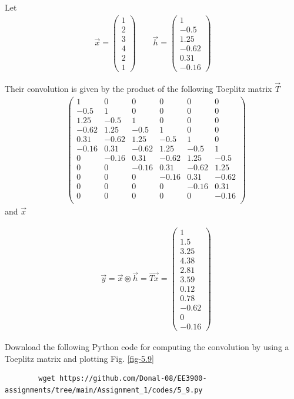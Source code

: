 \documentclass[journal,12pt,twocolumn]{IEEEtran}
\newcommand{\myvec}[1]{\ensuremath{\begin{pmatrix}#1\end{pmatrix}}}
\renewcommand\thesection{\arabic{section}}
\begin{document}
\begin{enumerate}[label=\thesection.\arabic*]
	\solution Let 
	\begin{align}
		\vec{x} = \myvec{1 \\ 2 \\ 3 \\ 4 \\ 2 \\ 1} \qquad
		\vec{h} = \myvec{1 \\ -0.5 \\ 1.25 \\ -0.62 \\ 0.31 \\ -0.16}
	\end{align}
	
	Their convolution is given by the product of the following Toeplitz matrix $\vec{T}$
	\begin{align}
		&\myvec{
			1 & 0 & 0 & 0 & 0 & 0 \\
			-0.5 & 1 & 0 & 0 & 0 & 0 \\
			1.25 & -0.5 & 1 & 0 & 0 & 0 \\
			-0.62 & 1.25 & -0.5 & 1 & 0 & 0 \\
			0.31 & -0.62 & 1.25 & -0.5 & 1 & 0 \\
			-0.16 & 0.31 & -0.62 & 1.25 & -0.5 & 1 \\
			0 & -0.16 & 0.31 & -0.62 & 1.25 & -0.5 \\
			0 & 0 & -0.16 & 0.31 & -0.62 & 1.25 \\
			0 & 0 & 0 & -0.16 & 0.31 & -0.62 \\
			0 & 0 & 0 & 0 & -0.16 & 0.31 \\
			0 & 0 & 0 & 0 & 0 & -0.16 \\
		} 
	\end{align}
	and $\vec{x}$
	
	\begin{align}
		&\vec{y} = \vec{x} \circledast \vec{h} = \vec{Tx} = \myvec{1 \\ 1.5 \\ 3.25 \\ 4.38 \\ 2.81 \\ 3.59 \\ 0.12 \\ 0.78 \\ -0.62 \\ 0 \\ -0.16}
	\end{align}
	
	Download the following Python code for computing the convolution by using a Toeplitz matrix and plotting Fig. \ref{fig-5.9}
	\begin{lstlisting}
		wget https://github.com/Donal-08/EE3900-assignments/tree/main/Assignment_1/codes/5_9.py
	\end{lstlisting}
	

\end{enumerate}
\end{document}
